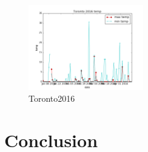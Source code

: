 \documentclass[DIV=calc, paper=a4, fontsize=11pt, twocolumn]{scrartcl}
\begin{document}
\begin{figure}[h!]
	\centering
	\includegraphics[width=50mm]{../output/plot_images/Toronto_2016.png}
	\caption{Toronto2016}
	\label{fig:method6}
\end{figure}


\section{Conclusion}

\end{document}
